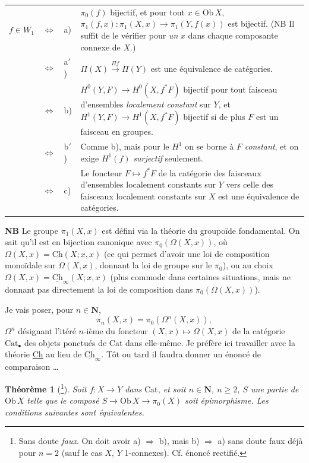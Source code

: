 \documentclass[11pt]{article}
\newcommand{\printedpage}[1]{\marginpar{\footnotesize p.~#1}}
\newcommand{\msp}[1]{\marginpar{\footnotesize [#1]}}
\newcommand{\Ch}{\underline{\mathrm{Ch}}}
\newcommand{\Ob}{\mathrm{Ob}\,}
\begin{document}
\noindent\begin{tabular}{@{}l c l p{}@{}}
$f \in W_1$ & $\Longleftrightarrow$ & a) & $\pi_0(f)$ bijectif, et pour tout $x \in \Ob X$, $\pi_1(f,x) : \pi_1(X,x) \longrightarrow \pi_1(Y,f(x))$ est bijectif. (NB Il suffit de le vérifier pour \textit{un} $x$ dans chaque composante connexe de $X$.)\\
 & $\Longleftrightarrow$ & a$'$) & $\Pi(X) \xrightarrow{\Pi f} \Pi(Y)$ est une équivalence de catégories.\\
 & $\Longleftrightarrow$ & b) & $H^0(Y,F) \longrightarrow H^0(X,f^*F)$ bijectif pour tout faisceau d'ensembles \textit{localement constant} sur $Y$, et $H^1(Y,F) \longrightarrow H^1(X,f^*F)$ bijectif si de plus $F$ est un faisceau en groupes.\\
 & $\Longleftrightarrow$ & b$'$) & Comme b), mais pour le $H^1$ on se borne à $F$ \textit{constant}, et on exige $H^1(f)$ \textit{surjectif} seulement.\\
 & $\Longleftrightarrow$ & c) & Le foncteur $F \longmapsto f^*F$ de la catégorie des faisceaux d'ensembles localement constants sur $Y$ vers celle des faisceaux localement constants sur $X$ est une équivalence de catégories.
\end{tabular}

\clearpage

\printedpage{116}

\msp{page 172}

\textbf{NB} Le groupe $\pi_1(X,x)$ est défini via la théorie du groupoïde fondamental. On sait qu'il est en bijection canonique avec $\pi_0(\Omega(X,x))$, où $\Omega(X,x) = \Ch(X;x,x)$ (ce qui permet d'avoir une loi de composition monoïdale sur $\Omega(X,x)$, donnant la loi de groupe sur le $\pi_0$), ou au choix $\Omega(X,x) = \Ch_\infty(X;x,x)$ (plus commode dans certaines situations, mais ne donnant pas directement la loi de composition dans $\pi_0(\Omega(X,x))$).

Je vais poser, pour $n \in \mathbf{N}$,
\[
\pi_n(X,x) = \pi_0(\Omega^n(X,x)),
\]
$\Omega^n$ désignant l'itéré $n$-ième du foncteur $(X,x) \longmapsto \Omega(X,x)$ de la catégorie $\mathrm{Cat}_\bullet$ des objets ponctués de Cat dans elle-même. Je préfère ici travailler avec la théorie \underline{Ch} au lieu de $\Ch_\infty$. Tôt ou tard il faudra donner un énoncé de comparaison \dots

\textbf{Théorème 1} (\footnote[112]{Sans doute \textit{faux}. On doit avoir a) $\Longrightarrow$ b), mais b) $\Longrightarrow$ a) sans doute faux déjà pour $n = 2$ (sauf le cas $X$, $Y$ 1-connexes). Cf. énoncé rectifié.}). \textit{Soit $f : X \longrightarrow Y$ dans} Cat\textit{, et soit $n \in \mathbf{N}$, $n \geq 2$, $S$ une partie de} $\Ob X$ \textit{telle que le composé $S \longrightarrow \Ob X \longrightarrow \pi_0(X)$ soit} \textit{épimorphisme. Les conditions suivantes sont équivalentes.}
\end{document}
